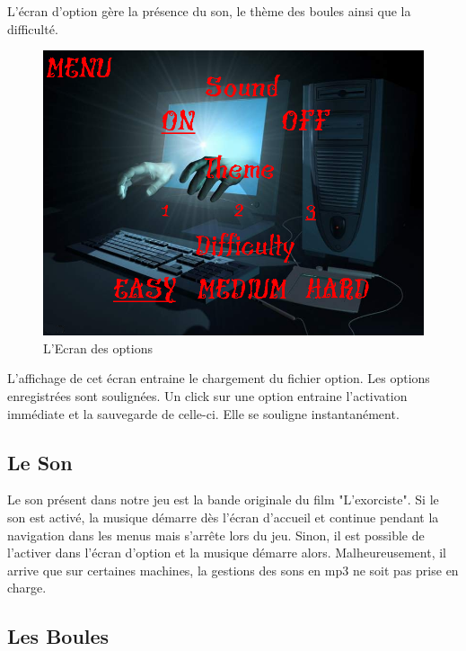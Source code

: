 L'écran d'option gère la présence du son, le thème des boules ainsi que la difficulté.
\begin{figure}[H]
\begin{center}
\includegraphics[scale=0.3]{img/optionscomplet.png}
\caption {L'Ecran des options}
\end{center}
\end{figure}
L'affichage de cet écran entraine le chargement du fichier option. Les options enregistrées sont soulignées. Un click sur une option entraine l'activation immédiate et la sauvegarde de celle-ci. Elle se souligne instantanément.

\subsection{Le Son}
Le son présent dans notre jeu est la bande originale du film "L'exorciste". Si le son est activé, la musique démarre dès l'écran d'accueil et continue pendant la navigation dans les menus mais s'arrête lors du jeu. Sinon, il est possible de l'activer dans l'écran d'option et la musique démarre alors. Malheureusement, il arrive que sur certaines machines, la gestions des sons en mp3 ne soit pas prise en charge. 

\subsection{Les Boules}

